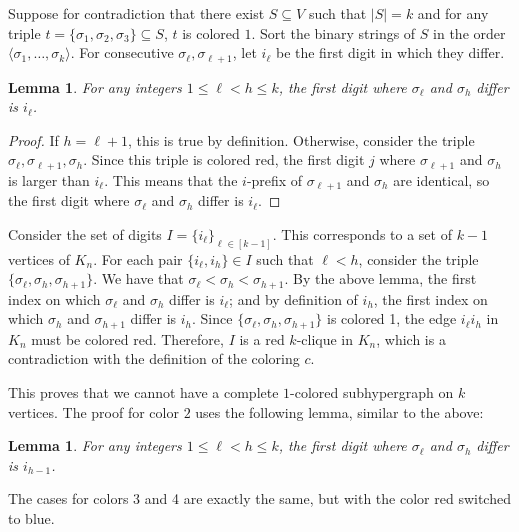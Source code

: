 \documentclass[11pt,letterpaper]{article}
\newtheorem{lemma}[theorem]{Lemma}
\theoremstyle{definition}
\begin{document}
Suppose for contradiction that there exist $S\subseteq V$ such that $|S|=k$ and for any triple $t = \{\sigma_1,\sigma_2,\sigma_3\}\subseteq S$, $t$ is colored $1$.
Sort the binary strings of $S$ in the order $\langle \sigma_1,\dots ,\sigma_k\rangle$.
For consecutive $\sigma_{\ell}, \sigma_{\ell+1}$, let $i_\ell$ be the first digit in which they differ.

\begin{lemma}
    For any integers $1\leq \ell<h\leq k$, the first digit where $\sigma_\ell$ and $\sigma_h$ differ is $i_\ell$.
\end{lemma}
\begin{proof}
    If $h=\ell+1$, this is true by definition.
    Otherwise, consider the triple $\sigma_\ell,\sigma_{\ell+1},\sigma_{h}$.
    Since this triple is colored red, the first digit $j$ where $\sigma_{\ell+1}$ and $\sigma_{h}$ is larger than $i_\ell$.
    This means that the $i$-prefix of $\sigma_{\ell+1}$ and $\sigma_{h}$ are identical, so the first digit where $\sigma_\ell$ and $\sigma_h$ differ is $i_\ell$.
\end{proof}

Consider the set of digits $I=\{i_{\ell}\}_{\ell\in [k-1]}$. 
This corresponds to a set of $k-1$ vertices of $K_n$.
For each pair $\{i_\ell,i_h\}\in I$ such that $\ell<h$, consider the triple $\{\sigma_\ell,\sigma_h,\sigma_{h+1}\}$.
We have that $\sigma_\ell<\sigma_h<\sigma_{h+1}$.
By the above lemma, the first index on which $\sigma_\ell$ and $\sigma_h$ differ is $i_\ell$; and by definition of $i_h$, the first index on which $\sigma_h$ and $\sigma_{h+1}$ differ is $i_h$.
Since $\{\sigma_\ell,\sigma_h,\sigma_{h+1}\}$ is colored 1, the edge $i_\ell i_h$ in $K_n$ must be colored red.
Therefore, $I$ is a red $k$-clique in $K_n$, which is a contradiction with the definition of the coloring $c$.

This proves that we cannot have a complete $1$-colored subhypergraph on $k$ vertices.
The proof for color $2$ uses the following lemma, similar to the above:
\begin{lemma}
    For any integers $1\leq \ell<h\leq k$, the first digit where $\sigma_\ell$ and $\sigma_h$ differ is $i_{h-1}$.
\end{lemma}
The cases for colors 3 and 4 are exactly the same, but with the color red switched to blue.
\end{document}
